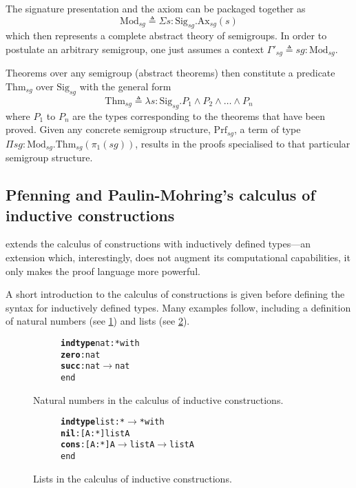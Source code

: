 \documentclass[12pt,toc=bibliography,numbers=noendperiod,
               footnotes=multiple,twoside]{scrartcl}
\begin{document}
The signature presentation and the axiom can be packaged together as \[\textrm{Mod}_{sg} \triangleq \Sigma s : \textrm{Sig}_{sg}. \textrm{Ax}_{sg}(s)\] which then represents a complete abstract theory of semigroups. In order to postulate an arbitrary semigroup, one just assumes a context \(\Gamma'_{sg} \triangleq sg : \textrm{Mod}_{sg}\).

Theorems over any semigroup (abstract theorems) then constitute a predicate \(\textrm{Thm}_{sg}\) over \(\textrm{Sig}_{sg}\) with the general form \[\textrm{Thm}_{sg} \triangleq \lambda s : \textrm{Sig}_{sg}. P_1 \wedge P_2 \wedge \dots \wedge P_n\] where \(P_1\) to \(P_n\) are the types corresponding to the theorems that have been proved. Given any concrete semigroup structure, \(\textrm{Prf}_{sg}\), a term of type \(\Pi sg : \textrm{Mod}_{sg}. \textrm{Thm}_{sg}(\pi_1(sg))\), results in the proofs specialised to that particular semigroup structure.

\subsection{Pfenning and Paulin-Mohring's calculus of inductive constructions}

\textcite{pfenning_inductively_1990} extends the calculus of constructions with inductively defined types---an extension which, interestingly, does not augment its computational capabilities, it only makes the proof language more powerful.

A short introduction to the calculus of constructions is given before defining the syntax for inductively defined types. Many examples follow, including a definition of natural numbers (see \cref{fig:nat-inductive-type}) and lists (see \cref{fig:list-inductive-type}).

\begin{figure}[h]
\centering
\begin{subfigure}[t]{0.3\textwidth}
\begin{alltt}
\textbf{indtype} nat : * with
    \textbf{zero} : nat
    \textbf{succ} : nat \(\rightarrow\) nat
end
\end{alltt}
\end{subfigure}
\caption{Natural numbers in the calculus of inductive constructions.}
\label{fig:nat-inductive-type}
\end{figure}

\begin{figure}[h]
\centering
\begin{subfigure}[t]{0.4\textwidth}
\begin{alltt}
\textbf{indtype} list : * \(\rightarrow\) * with
    \textbf{nil}  : [A : *] list A
    \textbf{cons} : [A : *] A \(\rightarrow\) list A \(\rightarrow\) list A
end
\end{alltt}
\end{subfigure}
\caption{Lists in the calculus of inductive constructions.}
\label{fig:list-inductive-type}
\end{figure}
\end{document}
